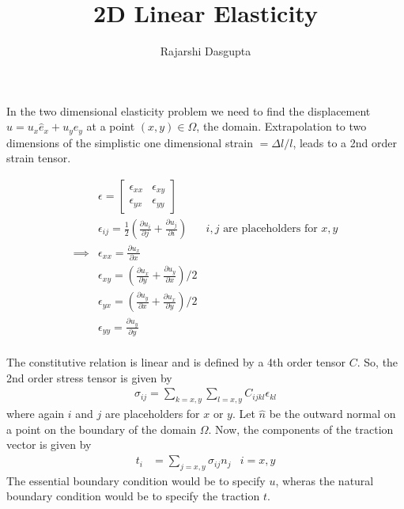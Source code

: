 \documentclass{article}
\title{2D Linear Elasticity}
\author{
	Rajarshi Dasgupta
	}
\newcommand{\pder}[2]{\frac{\partial #1}{\partial #2}}
\begin{document}
\maketitle

In the two dimensional elasticity problem
we need to find the displacement $u = u_x \hat{e}_x + u_y \hat{e}_y$
at a point $(x,y) \in \Omega$, the domain.
Extrapolation to two dimensions
of the simplistic one dimensional strain $= \Delta l / l$,
leads to a 2nd order strain tensor.

\begin{align*}
  & \epsilon = 
  \begin{bmatrix}
    \epsilon_{xx} & \epsilon_{xy} \\ \epsilon_{yx} & \epsilon_{yy}
  \end{bmatrix} \\
  & \epsilon_{ij} = \frac{1}{2} \left( \pder{u_i}{j} + \pder{u_j}{i} \right)
  & i,j \mbox{ are placeholders for } x,y\\
  \implies & \epsilon_{xx} = \pder{u_x}{x} \\
  & \epsilon_{xy} = \left( \pder{u_x}{y} + \pder{u_y}{x} \right)/2\\
  & \epsilon_{yx} = \left( \pder{u_y}{x} + \pder{u_x}{y} \right)/2\\
  & \epsilon_{yy} = \pder{u_y}{y} \\
\end{align*}

The constitutive relation is linear
and is defined by a 4th order tensor $C$.
So, the 2nd order stress tensor is given by
\begin{align*}
  \sigma_{ij} = \sum_{k=x,y} \sum_{l=x,y} C_{ijkl} \epsilon_{kl}
\end{align*}
where again $i$ and $j$ are placeholders for $x$ or $y$.
Let $\hat{n}$ be the outward normal on a point on the boundary
of the domain $\Omega$.
Now, the components of the traction vector is given by
\begin{align*}
  t_i & = \sum_{j=x,y} \sigma_{ij} n_j & i=x,y
\end{align*}
The essential boundary condition
would be to specify $u$,
wheras the natural boundary condition
would be to specify the traction $t$.
\end{document}
